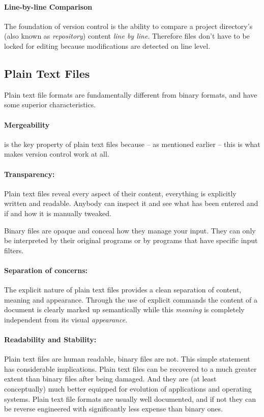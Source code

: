 \documentclass[11pt,a4paper]{article}
\begin{document}
\paragraph{Line-by-line Comparison}
The foundation of version control is the ability to compare a project directory's (also
known as \emph{repository}) content \emph{line by line}. Therefore files don't have to be locked for editing because modifications are detected on line level.

\subsection{Plain Text Files}
Plain text file formats are fundamentally different from binary formats,
and have some superior characteristics.

\paragraph{Mergeability}
is the key property of plain text files because -- as mentioned earlier -- this is what
makes version control work at all.

\paragraph{Transparency:}
Plain text files reveal every aspect of their content, everything is explicitly written
and readable. Anybody can inspect it and see what has been entered and if and how it is
manually tweaked. 

Binary files are opaque and conceal how they manage your input. They can only be
interpreted by their original programs or by programs that have specific input filters.

\paragraph{Separation of concerns:}
The explicit nature of plain text files provides a clean separation of content, meaning
and appearance. Through the use of explicit commands the content
of a document is clearly marked up semantically while this \emph{meaning} is completely
independent from its visual \emph{appearance}.

\paragraph{Readability and Stability:}
Plain text files are human readable, binary files are not. This simple statement has
considerable implications. Plain text files can be recovered to a much greater extent
than binary files after being damaged. And they are (at least conceptually) much better
equipped for evolution of applications and operating systems. Plain text file formats are
usually well documented, and if not they can be reverse engineered with significantly
less expense than binary ones.
\end{document}
